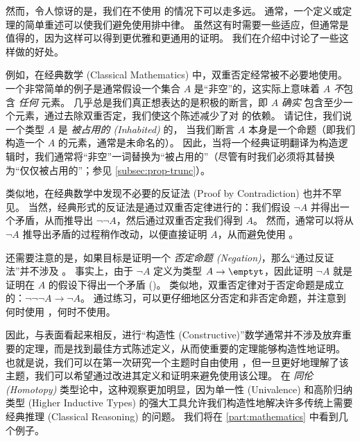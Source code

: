 然而，令人惊讶的是，我们在不使用 \LEM{} 的情况下可以走多远。
通常，一个定义或定理的简单重述可以使我们避免使用排中律。
虽然这有时需要一些适应，但通常是值得的，因为这样可以得到更优雅和更通用的证明。
我们在介绍中讨论了一些这样做的好处。

例如，在经典数学 (Classical Mathematics) 中，双重否定经常被不必要地使用。
一个非常简单的例子是通常假设一个集合 $A$ 是“非空”的，这实际上意味着 $A$ \emph{不}包含 \emph{任何} 元素。
几乎总是我们真正想表达的是积极的断言，即 $A$ \emph{确实} 包含至少一个元素，通过去除双重否定，我们使这个陈述减少了对 \LEM{} 的依赖。
请记住，我们说一个类型 $A$ 是 \emph{被占用的 (Inhabited)} 的，
%
当我们断言 $A$ 本身是一个命题（即我们构造一个 $A$ 的元素，通常是未命名的）。
因此，当将一个经典证明翻译为构造逻辑时，我们通常将“非空”一词替换为“被占用的”（尽管有时我们必须将其替换为“仅仅被占用的”；参见 \cref{subsec:prop-trunc}）。

类似地，在经典数学中发现不必要的反证法 (Proof by Contradiction) 也并不罕见。
%
当然，经典形式的反证法是通过双重否定律进行的：我们假设 $\neg A$ 并得出一个矛盾，从而推导出 $\neg \neg A$，然后通过双重否定我们得到 $A$。
然而，通常可以将从 $\neg A$ 推导出矛盾的过程稍作改动，以便直接证明 $A$，从而避免使用 \LEM{}。

还需要注意的是，如果目标是证明一个 \emph{否定命题 (Negation)}，那么“通过反证法”并不涉及 \LEM{}。
事实上，由于 $\neg A$ 定义为类型 $A\to\emptyt$，因此证明 $\neg A$ 就是证明在 $A$ 的假设下得出一个矛盾 (\emptyt)。
类似地，双重否定律对于否定命题是成立的：$\neg\neg\neg A \to \neg A$。
通过练习，可以更仔细地区分否定和非否定命题，并注意到何时使用 \LEM{}，何时不使用。

因此，与表面看起来相反，进行“构造性 (Constructive)”数学通常并不涉及放弃重要的定理，而是找到最佳方式陈述定义，从而使重要的定理能够构造性地证明。
也就是说，我们可以在第一次研究一个主题时自由使用 \LEM{}，但一旦更好地理解了该主题，我们可以希望通过改进其定义和证明来避免使用该公理。
在 \emph{同伦 (Homotopy)} 类型论中，这种观察更加明显，因为单一性 (Univalence) 和高阶归纳类型 (Higher Inductive Types) 的强大工具允许我们构造性地解决许多传统上需要经典推理 (Classical Reasoning) 的问题。
我们将在 \cref{part:mathematics} 中看到几个例子。

